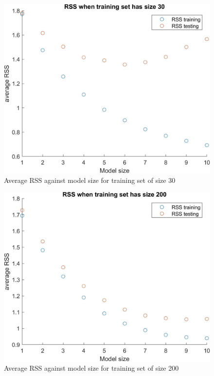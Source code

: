 \documentclass{article}
\begin{document}
	\begin{figure}[h]
		\centering
		\includegraphics[scale = 0.2]{figures/q2_1.jpg}
		\caption{Average RSS against model size for training set of size 30}
		\label{fig:Q2_1}
		
	\end{figure}

	\begin{figure}[h]
		\centering
		\includegraphics[scale = 0.2]{figures/q2_2.jpg}
		\caption{Average RSS against model size for training set of size 200}
		\label{fig:Q2_2}
		
	\end{figure}
	\clearpage
\end{document}
